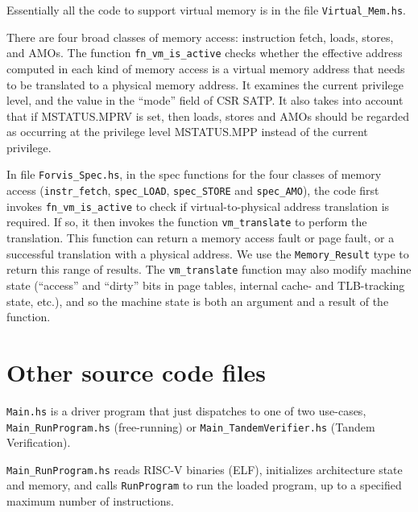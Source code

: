 \documentclass[11pt]{article}
\begin{document}
\label{sec_vm}

Essentially all the code to support virtual memory is in the file
\verb|Virtual_Mem.hs|.

There are four broad classes of memory access: instruction fetch,
loads, stores, and AMOs.  The function \verb|fn_vm_is_active| checks
whether the effective address computed in each kind of memory access
is a virtual memory address that needs to be translated to a physical
memory address.  It examines the current privilege level, and the
value in the ``mode'' field of CSR SATP.  It also takes into account
that if MSTATUS.MPRV is set, then loads, stores and AMOs should be
regarded as occurring at the privilege level MSTATUS.MPP instead of
the current privilege.



In file \verb|Forvis_Spec.hs|, in the spec functions for the four
classes of memory access (\verb|instr_fetch|, \verb|spec_LOAD|,
\verb|spec_STORE| and \verb|spec_AMO|), the code first invokes
\verb|fn_vm_is_active| to check if virtual-to-physical address
translation is required.  If so, it then invokes the function
\verb|vm_translate| to perform the translation.  This function can
return a memory access fault or page fault, or a successful
translation with a physical address.  We use the \verb|Memory_Result|
type to return this range of results.  The \verb|vm_translate|
function may also modify machine state (``access'' and ``dirty'' bits
in page tables, internal cache- and TLB-tracking state, etc.), and so
the machine state is both an argument and a result of the function.




\section{Other source code files}

\label{sec_misc}

\verb|Main.hs| is a driver program that just dispatches to one of two
use-cases, \verb|Main_RunProgram.hs| (free-running) or
\verb|Main_TandemVerifier.hs| (Tandem Verification).

\verb|Main_RunProgram.hs| reads RISC-V binaries (ELF), initializes
architecture state and memory, and calls \verb|RunProgram| to run the
loaded program, up to a specified maximum number of instructions.
\end{document}
